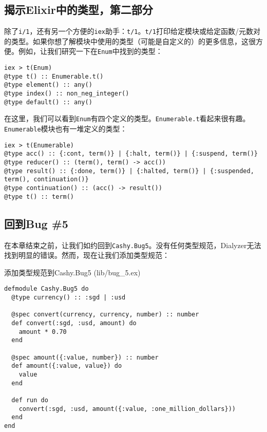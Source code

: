 \subsection{揭示Elixir中的类型，第二部分}

除了\texttt{i/1}，还有另一个方便的\texttt{iex}助手：\texttt{t/1}。\texttt{t/1}打印给定模块或给定函数/元数对的类型。如果你想了解模块中使用的类型（可能是自定义的）的更多信息，这很方便。例如，让我们研究一下在\texttt{Enum}中找到的类型：

\begin{code}{}
\begin{verbatim}
iex > t(Enum)
@type t() :: Enumerable.t()
@type element() :: any()
@type index() :: non_neg_integer()
@type default() :: any()
\end{verbatim}
\end{code}

在这里，我们可以看到\texttt{Enum}有四个定义的类型。\texttt{Enumerable.t}看起来很有趣。\texttt{Enumerable}模块也有一堆定义的类型：

\begin{code}{}
\begin{verbatim}
iex > t(Enumerable)
@type acc() :: {:cont, term()} | {:halt, term()} | {:suspend, term()}
@type reducer() :: (term(), term() -> acc())
@type result() :: {:done, term()} | {:halted, term()} | {:suspended, term(), continuation()}
@type continuation() :: (acc() -> result())
@type t() :: term()
\end{verbatim}
\end{code}

\subsection{回到Bug \#5}

在本章结束之前，让我们如约回到\texttt{Cashy.Bug5}。没有任何类型规范，Dialyzer无法找到明显的错误。然而，现在让我们添加类型规范：

\begin{code}{添加类型规范到Cashy.Bug5 (lib/bug\_5.ex)}

\begin{verbatim}
defmodule Cashy.Bug5 do
  @type currency() :: :sgd | :usd

  @spec convert(currency, currency, number) :: number
  def convert(:sgd, :usd, amount) do
    amount * 0.70
  end

  @spec amount({:value, number}) :: number
  def amount({:value, value}) do
    value
  end

  def run do
    convert(:sgd, :usd, amount({:value, :one_million_dollars}))
  end
end
\end{verbatim}
\end{code}


